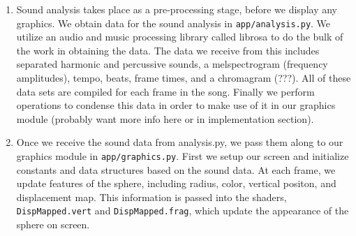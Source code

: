 \documentclass{article}
\newcommand{\code}{\texttt}
\begin{document}
\begin{enumerate}[(1)]

\item  Sound analysis takes place as a pre-processing stage, before we display any graphics. We obtain data for the sound analysis in \code{app/analysis.py}. We utilize an audio and music processing library called librosa to do the bulk of the work in obtaining the data. The data we receive from this includes separated harmonic and percussive sounds, a melspectrogram (frequency amplitudes), tempo, beats, frame times, and a chromagram (???). All of these data sets are compiled for each frame in the song. Finally we perform operations to condense this data in order to make use of it in our graphics module (probably want more info here or in implementation section).

\item Once we receive the sound data from analysis.py, we pass them along to our graphics module in \code{app/graphics.py}. First we setup our screen and initialize constants and data structures based on the sound data. At each frame, we update features of the sphere, including radius, color, vertical positon, and displacement map. This information is passed into the shaders, \code{DispMapped.vert} and \code{DispMapped.frag}, which update the appearance of the sphere on screen. 

\end{enumerate}
\end{document}
